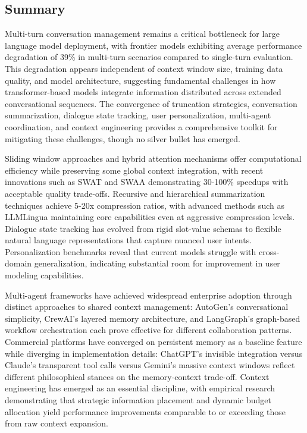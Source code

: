 \documentclass[11pt,letterpaper]{article}
\begin{document}
\subsection{Summary}

Multi-turn conversation management remains a critical bottleneck for large language model deployment, with frontier models exhibiting average performance degradation of 39\% in multi-turn scenarios compared to single-turn evaluation. This degradation appears independent of context window size, training data quality, and model architecture, suggesting fundamental challenges in how transformer-based models integrate information distributed across extended conversational sequences. The convergence of truncation strategies, conversation summarization, dialogue state tracking, user personalization, multi-agent coordination, and context engineering provides a comprehensive toolkit for mitigating these challenges, though no silver bullet has emerged.

Sliding window approaches and hybrid attention mechanisms offer computational efficiency while preserving some global context integration, with recent innovations such as SWAT and SWAA demonstrating 30-100\% speedups with acceptable quality trade-offs. Recursive and hierarchical summarization techniques achieve 5-20x compression ratios, with advanced methods such as LLMLingua maintaining core capabilities even at aggressive compression levels. Dialogue state tracking has evolved from rigid slot-value schemas to flexible natural language representations that capture nuanced user intents. Personalization benchmarks reveal that current models struggle with cross-domain generalization, indicating substantial room for improvement in user modeling capabilities.

Multi-agent frameworks have achieved widespread enterprise adoption through distinct approaches to shared context management: AutoGen's conversational simplicity, CrewAI's layered memory architecture, and LangGraph's graph-based workflow orchestration each prove effective for different collaboration patterns. Commercial platforms have converged on persistent memory as a baseline feature while diverging in implementation details: ChatGPT's invisible integration versus Claude's transparent tool calls versus Gemini's massive context windows reflect different philosophical stances on the memory-context trade-off. Context engineering has emerged as an essential discipline, with empirical research demonstrating that strategic information placement and dynamic budget allocation yield performance improvements comparable to or exceeding those from raw context expansion.
\end{document}
